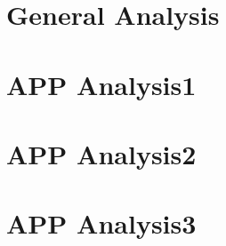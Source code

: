 \section{General Analysis}

\section{APP Analysis1}

\section{APP Analysis2}

\section{APP Analysis3}




